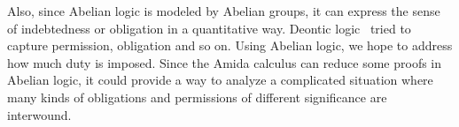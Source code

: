 Also, since Abelian logic is modeled by Abelian groups, it can express the
sense of indebtedness or obligation in a quantitative way.
Deontic logic~\citep{von1951deontic,sep-logic-deontic} tried to capture permission,
obligation and so on.
Using Abelian logic, we hope to address how much duty is imposed.
Since the Amida calculus can reduce some proofs in Abelian logic, it could
provide a way to analyze a complicated situation where many kinds of
obligations and permissions of different significance are interwound.
